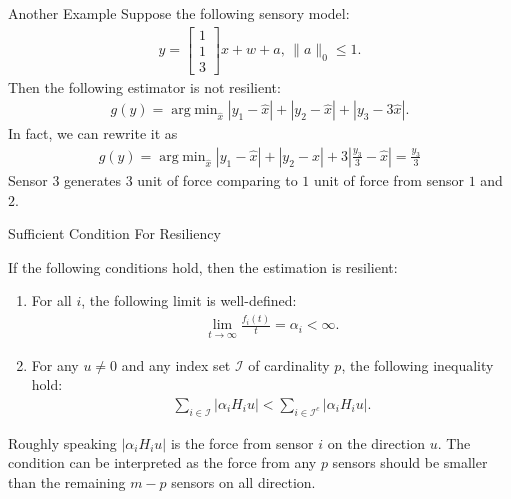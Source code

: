 \documentclass{beamer}
\DeclareMathOperator{\argmin}{arg\;min}
\begin{document}
\begin{frame}{Another Example}
  Suppose the following sensory model:
  \begin{align*}
    y = \begin{bmatrix}
      1\\
      1\\
      3
    \end{bmatrix}x + w+a ,\,\|a\|_0\leq 1.
  \end{align*}
  Then the following estimator is not resilient:
  \begin{align*}
    g(y) = \argmin_{\hat x}  |y_1-\hat x|+|y_2-\hat x|+|y_3-3\hat x|.
  \end{align*}
  In fact, we can rewrite it as
  \begin{align*}
    g(y) = \argmin_{\hat x}  |y_1-\hat x|+|y_2-\hat x|+3\left|\frac{y_3}{3}-\hat x\right| = \frac{y_3}{3}
  \end{align*}
  Sensor $3$ generates $3$ unit of force comparing to $1$ unit of force from sensor $1$ and $2$.
\end{frame}


\begin{frame}{Sufficient Condition For Resiliency}
  \begin{theorem}
    If the following conditions hold, then the estimation is resilient:
    \begin{enumerate}
    \item For all $i$, the following limit is well-defined:
      \begin{align*}
        \lim_{t\rightarrow\infty}\frac{f_i(t)}{t} = \alpha_i < \infty.
      \end{align*}
    \item For any $u\neq 0$ and any index set $\mathcal I$ of cardinality $p$, the following inequality hold:
      \begin{align*}
        \sum_{i\in \mathcal I} |\alpha_i H_i u| < \sum_{i\in \mathcal I^c} |\alpha_i H_i u|.
      \end{align*}
    \end{enumerate}
  \end{theorem}
  Roughly speaking $|\alpha_i H_i u|$ is the force from sensor $i$ on the direction $u$. The condition can be interpreted as the force from any $p$ sensors should be smaller than the remaining $m-p$ sensors on all direction.
\end{frame}
\end{document}
